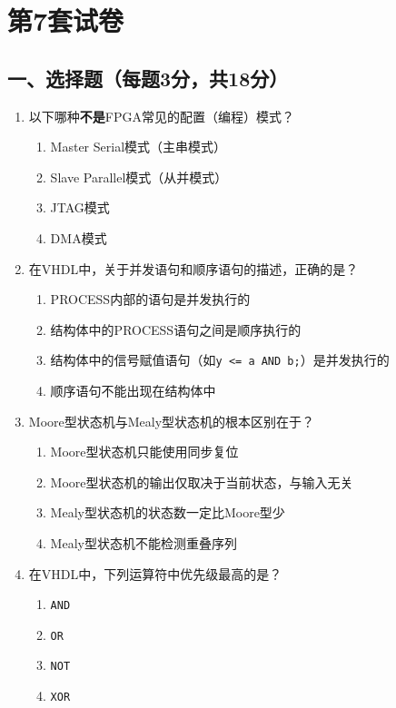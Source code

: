 \chapter{第7套试卷}

\section*{一、选择题（每题3分，共18分）}

\begin{enumerate}[label=\arabic*.]
\item 以下哪种\textbf{不是}FPGA常见的配置（编程）模式？
\begin{enumerate}[label=\Alph*.]
  \item Master Serial模式（主串模式）
  \item Slave Parallel模式（从并模式）
  \item JTAG模式
  \item DMA模式
\end{enumerate}

\item 在VHDL中，关于并发语句和顺序语句的描述，正确的是？
\begin{enumerate}[label=\Alph*.]
  \item PROCESS内部的语句是并发执行的
  \item 结构体中的PROCESS语句之间是顺序执行的
  \item 结构体中的信号赋值语句（如\verb|y <= a AND b;|）是并发执行的
  \item 顺序语句不能出现在结构体中
\end{enumerate}

\item Moore型状态机与Mealy型状态机的根本区别在于？
\begin{enumerate}[label=\Alph*.]
  \item Moore型状态机只能使用同步复位
  \item Moore型状态机的输出仅取决于当前状态，与输入无关
  \item Mealy型状态机的状态数一定比Moore型少
  \item Mealy型状态机不能检测重叠序列
\end{enumerate}

\item 在VHDL中，下列运算符中优先级最高的是？
\begin{enumerate}[label=\Alph*.]
  \item \texttt{AND}
  \item \texttt{OR}
  \item \texttt{NOT}
  \item \texttt{XOR}
\end{enumerate}


\end{enumerate}
